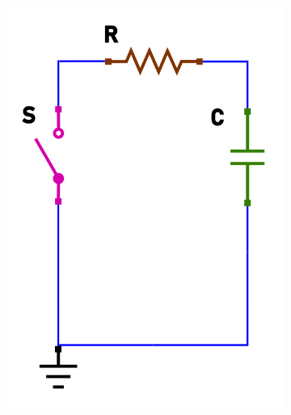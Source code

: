 \documentclass[12pt]{article}
\begin{document}
\begin{figure}[h!]
  \centering
  \begin{subfigure}[b]{0.3\linewidth}
    \includegraphics[width=\linewidth]{data/scarica-open.png}
  \end{subfigure}
  \begin{subfigure}[b]{0.3\linewidth}

\end{subfigure}
\end{figure}
\end{document}
